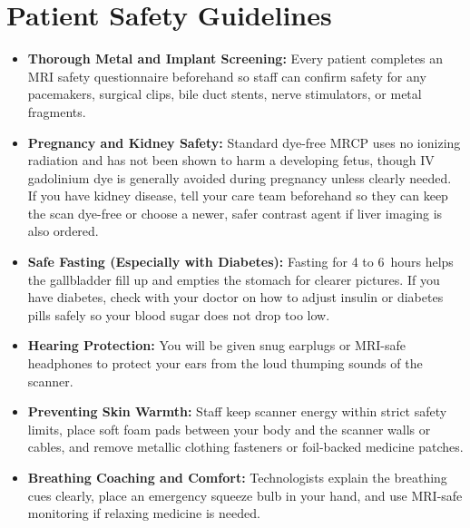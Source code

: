 \section{Patient Safety Guidelines}
\begin{itemize}
\item \textbf{Thorough Metal and Implant Screening:} Every patient completes an MRI safety questionnaire beforehand so staff can confirm safety for any pacemakers, surgical clips, bile duct stents, nerve stimulators, or metal fragments.
\item \textbf{Pregnancy and Kidney Safety:} Standard dye-free MRCP uses no ionizing radiation and has not been shown to harm a developing fetus, though IV gadolinium dye is generally avoided during pregnancy unless clearly needed. If you have kidney disease, tell your care team beforehand so they can keep the scan dye-free or choose a newer, safer contrast agent if liver imaging is also ordered.
\item \textbf{Safe Fasting (Especially with Diabetes):} Fasting for 4 to 6~hours helps the gallbladder fill up and empties the stomach for clearer pictures. If you have diabetes, check with your doctor on how to adjust insulin or diabetes pills safely so your blood sugar does not drop too low.
\item \textbf{Hearing Protection:} You will be given snug earplugs or MRI-safe headphones to protect your ears from the loud thumping sounds of the scanner.
\item \textbf{Preventing Skin Warmth:} Staff keep scanner energy within strict safety limits, place soft foam pads between your body and the scanner walls or cables, and remove metallic clothing fasteners or foil-backed medicine patches.
\item \textbf{Breathing Coaching and Comfort:} Technologists explain the breathing cues clearly, place an emergency squeeze bulb in your hand, and use MRI-safe monitoring if relaxing medicine is needed.
\end{itemize}


